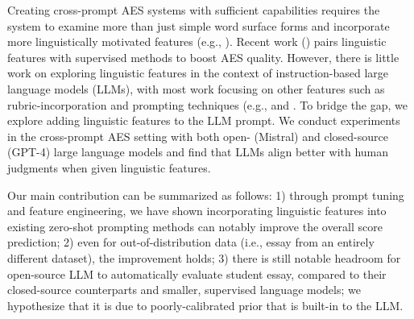  Creating cross-prompt AES systems with sufficient capabilities requires the system to examine more than just simple word surface forms and incorporate more linguistically motivated features (e.g., \cite{burstein1998}). Recent work (\cite{ridleyPromptAgnosticEssay2020, uto-etal-2020-neural}) pairs linguistic features with supervised methods to boost AES quality. However, there is little work on exploring linguistic features in the context of instruction-based large language models (LLMs), with most work focusing on other features such as rubric-incorporation \cite{hashemi-etal-2024-llm} and prompting techniques (e.g., \cite{liu-etal-2023-g} and \cite{chiang-lee-2023-closer}. To bridge the gap, we explore adding linguistic features to the LLM prompt. We conduct experiments in the cross-prompt AES setting with both open- (Mistral) and closed-source (GPT-4) large language models and find that LLMs align better with human judgments when given linguistic features. 
 
Our main contribution can be summarized as follows: 1) through prompt tuning and feature engineering, we have shown incorporating linguistic features into existing zero-shot prompting methods can notably improve the overall score prediction; 2) even for out-of-distribution data (i.e., essay from an entirely different dataset), the improvement holds; 3) there is still notable headroom for open-source LLM to automatically evaluate student essay, compared to their closed-source counterparts and smaller, supervised language models; we hypothesize that it is due to poorly-calibrated prior that is built-in to the LLM.